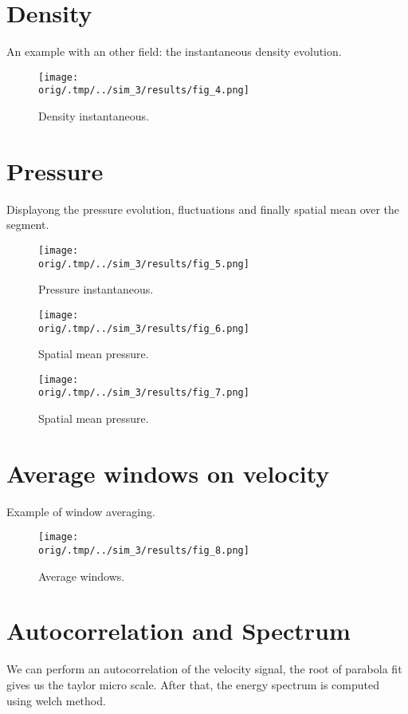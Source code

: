 \newpage
\section{Density}
An example with an other field: the instantaneous density evolution. 


\begin{figure}[h!]
\centering
\texttt{[image: \\orig/.tmp/../sim\_3/results/fig\_4.png]}
\caption{Density instantaneous.}
\label{fig4}
\end{figure}



\newpage
\section{Pressure}
Displayong the pressure evolution, fluctuations and finally spatial mean over the segment.


\begin{figure}[h!]
\centering
\texttt{[image: \\orig/.tmp/../sim\_3/results/fig\_5.png]}
\caption{Pressure instantaneous.}
\label{fig5}
\end{figure}

\begin{figure}[h!]
\centering
\texttt{[image: \\orig/.tmp/../sim\_3/results/fig\_6.png]}
\caption{Spatial mean pressure.}
\label{fig6}
\end{figure}

\begin{figure}[h!]
\centering
\texttt{[image: \\orig/.tmp/../sim\_3/results/fig\_7.png]}
\caption{Spatial mean pressure.}
\label{fig7}
\end{figure}

\newpage

\section{Average windows on velocity}
Example of window averaging.

\begin{figure}[h!]
\centering
\texttt{[image: \\orig/.tmp/../sim\_3/results/fig\_8.png]}
\caption{Average windows.}
\label{fig8}
\end{figure}

\newpage

\section{Autocorrelation and Spectrum}
We can perform an autocorrelation of the velocity signal, the root of parabola fit gives us the taylor micro scale. 
After that, the energy spectrum is computed using welch method.

